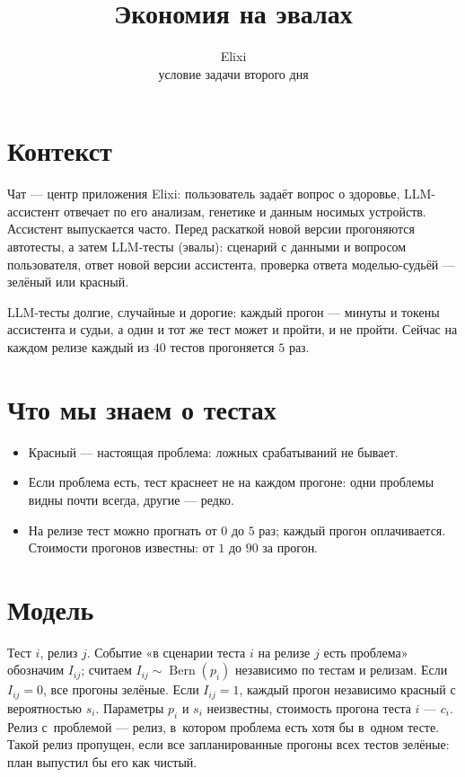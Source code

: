 \documentclass[11pt,a4paper]{article}
\title{Экономия на эвалах}
\author{Elixi\\[2pt]\small условие задачи второго дня}
\date{}
\newcommand{\Bern}{\operatorname{Bern}}
\begin{document}
\maketitle

\section*{Контекст}
Чат --- центр приложения Elixi: пользователь задаёт вопрос о здоровье, LLM-ассистент отвечает по его анализам, генетике и данным носимых устройств. Ассистент выпускается часто. Перед раскаткой новой версии прогоняются автотесты, а затем LLM-тесты (эвалы): сценарий с данными и вопросом пользователя, ответ новой версии ассистента, проверка ответа моделью-судьёй --- зелёный или красный.

LLM-тесты долгие, случайные и дорогие: каждый прогон --- минуты и токены ассистента и судьи, а один и тот же тест может и пройти, и не пройти. Сейчас на каждом релизе каждый из $40$ тестов прогоняется $5$ раз.

\section*{Что мы знаем о тестах}
\begin{itemize}
\item Красный --- настоящая проблема: ложных срабатываний не бывает.
\item Если проблема есть, тест краснеет не на каждом прогоне: одни проблемы видны почти всегда, другие --- редко.
\item На релизе тест можно прогнать от $0$ до $5$ раз; каждый прогон оплачивается. Стоимости прогонов известны: от $1$ до $90$ за прогон.
\end{itemize}

\section*{Модель}
Тест $i$, релиз $j$. Событие «в сценарии теста $i$ на релизе $j$ есть проблема» обозначим $I_{ij}$; считаем $I_{ij}\sim\Bern(p_i)$ независимо по тестам и релизам. Если $I_{ij}=0$, все прогоны зелёные. Если $I_{ij}=1$, каждый прогон независимо красный с вероятностью $s_i$. Параметры $p_i$ и $s_i$ неизвестны, стоимость прогона теста $i$ --- $c_i$. Релиз с~проблемой --- релиз, в~котором проблема есть хотя бы в~одном тесте. Такой релиз пропущен, если все запланированные прогоны всех тестов зелёные: план выпустил бы его как чистый.
\end{document}
